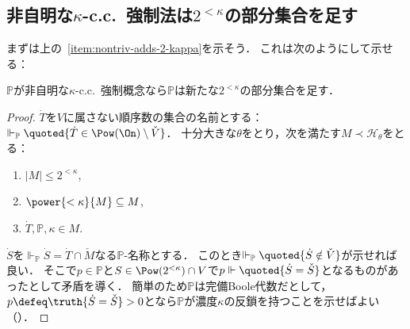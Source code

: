 \documentclass[a4j,leqno]{ltjsarticle}
\renewcommand{\emph}[1]{\textgt{\textsf{#1}}}
\newcommand{\cc}{c.c.\ }
\begin{document}
\subsection{非自明な$\kappa$-\cc{}強制法は$2^{<\kappa}$の部分集合を足す}
まずは上の~\ref{item:nontriv-adds-2-kappa}を示そう．
これは次のようにして示せる：
\begin{lemma}\label{lem:nontriv-2<kappa}
 $\mathbb{P}$が非自明な$\kappa$-\cc{}強制概念なら$\mathbb{P}$は新たな$2^{<\kappa}$の部分集合を足す．
\end{lemma}
\begin{proof}
 $\dot{T}$を$V$に属さない順序数の集合の名前とする：$\Vdash_{\mathbb{P}} \quoted{\dot{T} \in \Pow(\On) \setminus \check{V}}$．
 十分大きな$\theta$をとり，次を満たす$M \prec \mathcal{H}_\theta$をとる：
 \begin{enumerate}
 	\item $|M| \leq 2^{<\kappa}$,
 	\item $\power{<\kappa}{M} \subseteq M$,
 	\item $\dot{T}, \mathbb{P}, \kappa \in M$.
 \end{enumerate}
 $\dot{S}$を${}\Vdash_{\mathbb{P}} \dot{S} = \dot{T} \cap \check{M}$なる$\mathbb{P}$-名称とする．
 このとき$\Vdash_{\mathbb{P}} \quoted{\dot{S} \notin \check{V}}$が示せれば良い．
 そこで$p \in \mathbb{P}$と$S \in \Pow(2^{<\kappa}) \cap V$で$p \Vdash \quoted{\dot{S} = \check{S}}$となるものがあったとして矛盾を導く．
 簡単のため$\mathbb{P}$は完備Boole代数だとして，$p \defeq \truth{\dot{S} = \check{S}} > 0$となら$\mathbb{P}$が濃度$\kappa$の反鎖を持つことを示せばよい（\emph{背理法}）．


\end{proof}
\end{document}
